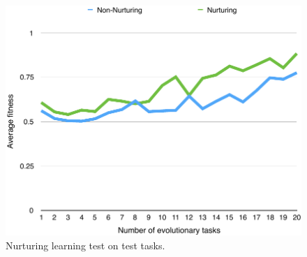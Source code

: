 \documentclass[master]{outhesis}
\begin{document}
\begin{figure}[H]
	\centering
	\includegraphics{NurturingLearningTestPlot.pdf}
	\caption{Nurturing learning test on test tasks.}
\end{figure}

\makebackmatter
\end{document}
